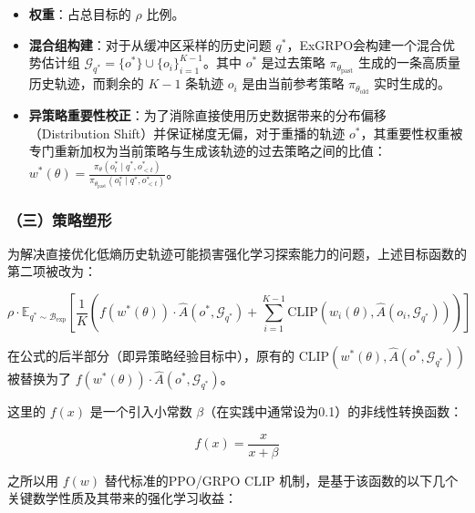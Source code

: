 \begin{itemize}
\tightlist
\item
  \textbf{权重}：占总目标的 \(\rho\) 比例。
\item
  \textbf{混合组构建}：对于从缓冲区采样的历史问题 \(q^{\ast}\)，ExGRPO会构建一个混合优势估计组 \(\mathcal{G}_{q^{\ast}}=\{o^{\ast}\}\cup\{o_i\}_{i=1}^{K-1}\)。其中 \(o^{\ast}\) 是过去策略 \(\pi_{\theta_{\mathrm{past}}}\) 生成的一条高质量历史轨迹，而剩余的 \(K-1\) 条轨迹 \(o_i\) 是由当前参考策略 \(\pi_{\theta_{\mathrm{old}}}\) 实时生成的。
\item
  \textbf{异策略重要性校正}：为了消除直接使用历史数据带来的分布偏移（Distribution Shift）并保证梯度无偏，对于重播的轨迹 \(o^{\ast}\)，其重要性权重被专门重新加权为当前策略与生成该轨迹的过去策略之间的比值：\(w^{\ast}(\theta)=\frac{\pi_\theta(o_t^{\ast}\mid q^{\ast},o_{\lt t}^{\ast})}{\pi_{\theta_{\mathrm{past}}}(o_t^{\ast}\mid q^{\ast},o_{\lt t}^{\ast})}\)。
\end{itemize}

\hypertarget{ux4e09ux7b56ux7565ux5851ux5f62}{%
\subsubsection{（三）策略塑形}\label{ux4e09ux7b56ux7565ux5851ux5f62}}

为解决直接优化低熵历史轨迹可能损害强化学习探索能力的问题，上述目标函数的第二项被改为：

\[
\rho\cdot
\mathbb{E}_{q^{\ast}\sim\mathcal{B}_{\mathrm{exp}}}
\left[
\frac{1}{K}
\left(
f\left(w^{\ast}(\theta)\right)\cdot\hat{A}(o^{\ast},\mathcal{G}_{q^{\ast}})
+\sum_{i=1}^{K-1}
\mathrm{CLIP}\left(w_i(\theta),\hat{A}(o_i,\mathcal{G}_{q^{\ast}})\right)
\right)
\right]
\]

在公式的后半部分（即异策略经验目标中），原有的 \(\mathrm{CLIP}\left(w^{\ast}(\theta),\hat{A}(o^{\ast},\mathcal{G}_{q^{\ast}})\right)\) 被替换为了 \(f\left(w^{\ast}(\theta)\right)\cdot\hat{A}(o^{\ast},\mathcal{G}_{q^{\ast}})\)。

这里的 \(f(x)\) 是一个引入小常数 \(\beta\)（在实践中通常设为0.1）的非线性转换函数：

\[
f(x)=\frac{x}{x+\beta}
\]

之所以用 \(f(w)\) 替代标准的PPO/GRPO \(\mathrm{CLIP}\) 机制，是基于该函数的以下几个关键数学性质及其带来的强化学习收益：

